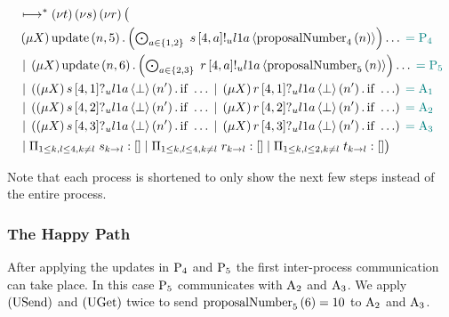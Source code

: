 \begin{align*}
&\mapstostar \NuChannels\big (\\
&\Mu{X} \update{n}{5} . \DotForall{\AcceptorIndex\in \{1,2\}}{\SendUnreliableP{s}{4}{\AcceptorIndex}{\LOneA}{\proposalNumber{n}{4}}}\dots \comment{= \Proposer{4}}\\
&\Or \Mu{X} \update{n}{6} . \DotForall{\AcceptorIndex\in \{2,3\}}{\SendUnreliableP{r}{4}{\AcceptorIndex}{\LOneA}{\proposalNumber{n}{5}}}\dots \comment{= \Proposer{5}}\\
&\Or \Paren{
    \Mu{X} \ReceiveUnreliableP{s}{4}{1}{\LOneA}{\bot}{n'}.\If{\dots}
    \Or \Mu{X} \ReceiveUnreliableP{r}{4}{1}{\LOneA}{\bot}{n'}.\If{\dots}
} \comment{= \Acceptor{1}}\\
&\Or \Paren{
    \Mu{X} \ReceiveUnreliableP{s}{4}{2}{\LOneA}{\bot}{n'}.\If{\dots}
    \Or \Mu{X} \ReceiveUnreliableP{r}{4}{2}{\LOneA}{\bot}{n'}.\If{\dots}
} \comment{= \Acceptor{2}}\\
&\Or \Paren{
    \Mu{X} \ReceiveUnreliableP{s}{4}{3}{\LOneA}{\bot}{n'}.\If{\dots}
    \Or \Mu{X} \ReceiveUnreliableP{r}{4}{3}{\LOneA}{\bot}{n'}.\If{\dots}
} \comment{= \Acceptor{3}}\\
&\Or \InnerSessionQueues{s}
\Or \InnerSessionQueues{r}
\Or \OuterSessionQueues
\big )
\end{align*}

Note that each process is shortened to only show the next few steps instead of the entire process.

\subsubsection{The Happy Path}
After applying the updates in $\Proposer{4}$ and $\Proposer{5}$ the first inter-process communication can take place.
In this case $\Proposer{5}$ communicates with $\Acceptor{2}$ and $\Acceptor{3}$.
We apply $\RUsend$ and $\RUget$ twice to send $\proposalNumber{6}{5} = 10$ to $\Acceptor{2}$ and $\Acceptor{3}$.


